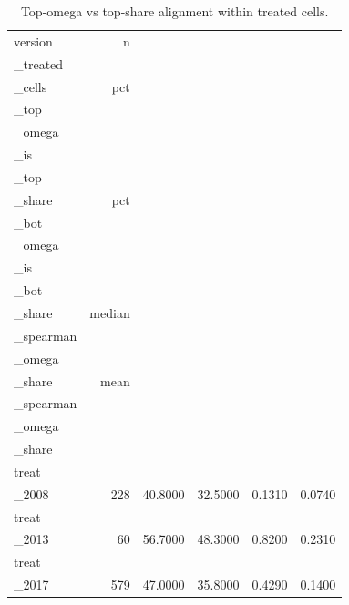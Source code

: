 \begin{table}[ht]
\centering
\caption{Top-omega vs top-share alignment within treated cells.} 
\begin{tabular}{lrrrrr}
  \toprule
version & n\\_treated\\_cells & pct\\_top\\_omega\\_is\\_top\\_share & pct\\_bot\\_omega\\_is\\_bot\\_share & median\\_spearman\\_omega\\_share & mean\\_spearman\\_omega\\_share \\ 
  \midrule
treat\\_2008 &   228 & 40.8000 & 32.5000 & 0.1310 & 0.0740 \\ 
  treat\\_2013 &    60 & 56.7000 & 48.3000 & 0.8200 & 0.2310 \\ 
  treat\\_2017 &   579 & 47.0000 & 35.8000 & 0.4290 & 0.1400 \\ 
   \bottomrule
\end{tabular}
\end{table}
